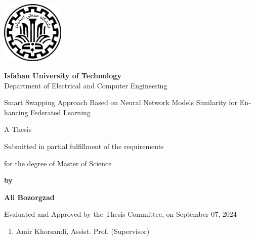 \thispagestyle{empty}
\begin{latin}
\begin{center}
\includegraphics[height=3cm]{iut_logo.png}
\vspace{0.4cm}

{\large\textbf{Isfahan University of Technology}}\\

\vspace{0.4cm}
Department of Electrical and Computer Engineering

\vspace{2.5cm}

{\Huge
	Smart Swapping Approach Based on Neural Network Models Similarity for Enhancing Federated Learning
}

\vspace{1.5cm}

{\large
	A Thesis
	
	\vspace{.3cm}
	
	Submitted in partial fulfillment of the requirements
	
	\vspace{.3cm}
	
	for the degree of Master of Science
}

	\vspace{1.5cm}

{\Large
	\textbf{by}
	
	\vspace{.3cm}
	
	\textbf{Ali Bozorgzad}
}
\end{center}

\vfill

Evaluated and Approved by the Thesis Committee, on September 07, 2024
\vspace{0.5cm}

\begin{enumerate}
\item Amir Khorsandi, Assist. Prof. (Supervisor)
\vspace{0.5cm}


\end{enumerate}
\end{latin}
